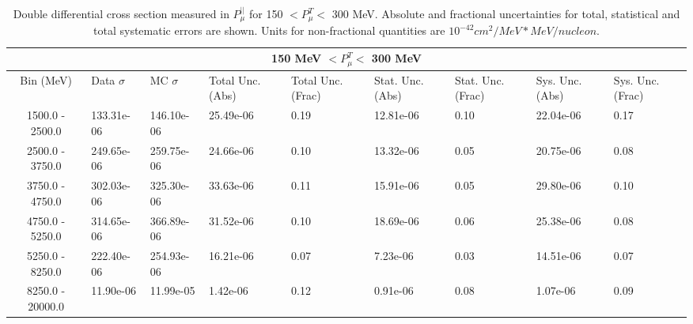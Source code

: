 \begin{table}[!htb]
    \centering
    \tiny
    \begin{tabular}{|c|p{0.5in}|p{0.5in}|p{0.5in}|p{0.5in}|p{0.5in}|p{0.5in}|p{0.5in}|p{0.5in}|}

        \hline
        \multicolumn{9}{c}{150 MeV $ < P^T_\mu < $ 300 MeV}\\
        \hline
        Bin (MeV)& Data $\sigma$ & MC $\sigma$ & Total Unc. (Abs) & Total Unc. (Frac)  & Stat. Unc. (Abs) & Stat. Unc. (Frac) & Sys. Unc. (Abs) & Sys. Unc. (Frac)\\ \hline
1500.0 - 2500.0 & 133.31e-06 & 146.10e-06 & 25.49e-06 & 0.19 & 12.81e-06 & 0.10 & 22.04e-06 & 0.17\\ \hline
2500.0 - 3750.0 & 249.65e-06 & 259.75e-06 & 24.66e-06 & 0.10 & 13.32e-06 & 0.05 & 20.75e-06 & 0.08\\ \hline
3750.0 - 4750.0 & 302.03e-06 & 325.30e-06 & 33.63e-06 & 0.11 & 15.91e-06 & 0.05 & 29.80e-06 & 0.10\\ \hline
4750.0 - 5250.0 & 314.65e-06 & 366.89e-06 & 31.52e-06 & 0.10 & 18.69e-06 & 0.06 & 25.38e-06 & 0.08\\ \hline
5250.0 - 8250.0 & 222.40e-06 & 254.93e-06 & 16.21e-06 & 0.07 & 7.23e-06 & 0.03 & 14.51e-06 & 0.07\\ \hline
8250.0 - 20000.0 & 11.90e-06 & 11.99e-05 & 1.42e-06 & 0.12 & 0.91e-06 & 0.08 & 1.07e-06 & 0.09\\ \hline

    \end{tabular}
    \caption{Double differential cross section measured in $P^{||}_\mu$ for 150 $ < P^T_\mu < $ 300 MeV. Absolute and fractional uncertainties for total, statistical and total systematic errors are shown. Units for non-fractional quantities are $10^{-42}cm^2/MeV*MeV/nucleon$.}
    \label{tab:ApdxA:XSecTable2Dpzmuptmu2}
\end{table}

